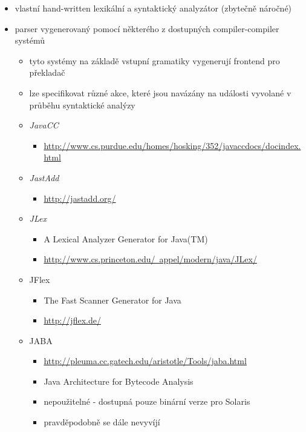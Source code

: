 \begin{itemize}
\item vlastní hand-written lexikální a syntaktický analyzátor (zbytečně náročné)
\item parser vygenerovaný pomocí některého z dostupných compiler-compiler systémů
  \begin{itemize}
  \item tyto systémy na základě vstupní gramatiky vygenerují frontend pro překladač
  \item lze specifikovat různé akce, které jsou navázány na události vyvolané v průběhu syntaktické analýzy
  \item \emph{JavaCC}
    \begin{itemize}
    \item \href{http://www.cs.purdue.edu/homes/hosking/352/javaccdocs/docindex.html}{http://www.cs.purdue.edu/homes/hosking/352/javaccdocs/docindex.html}
    \end{itemize}
  \item \emph{JastAdd}
    \begin{itemize}
    \item \href{http://jastadd.org/}{http://jastadd.org/}
    \end{itemize}
  \item \emph{JLex}
    \begin{itemize}
    \item A Lexical Analyzer Generator for Java(TM)
    \item \href{http://www.cs.princeton.edu/~appel/modern/java/JLex/}{http://www.cs.princeton.edu/~appel/modern/java/JLex/}
    \end{itemize}
  \item JFlex
    \begin{itemize}
    \item The Fast Scanner Generator for Java
    \item \href{http://jflex.de/}{http://jflex.de/}
    \end{itemize}
  \item JABA
    \begin{itemize}
    \item \href{http://pleuma.cc.gatech.edu/aristotle/Tools/jaba.html}{http://pleuma.cc.gatech.edu/aristotle/Tools/jaba.html}
    \item Java Architecture for Bytecode Analysis
    \item nepoužitelné - dostupná pouze binární verze pro Solaris
    \item pravděpodobně se dále nevyvíjí

\end{itemize}
\end{itemize}
\end{itemize}
